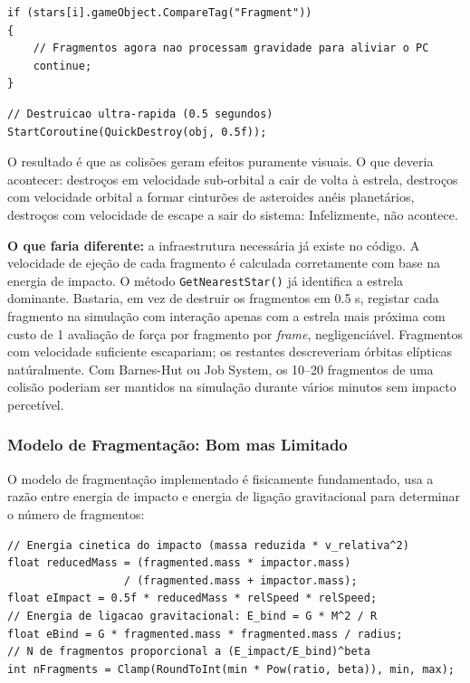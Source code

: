 \documentclass[12pt,a4paper]{article}
\begin{document}
\begin{lstlisting}[caption={StarSystemManager.cs - fragmentos exclu\'{i}dos do loop gravitacional}]
if (stars[i].gameObject.CompareTag("Fragment"))
{
    // Fragmentos agora nao processam gravidade para aliviar o PC
    continue;
}
\end{lstlisting}

\begin{lstlisting}[caption={PlanetCollision.cs --- destrui\c{c}\~{a}o em 0.5 s sem f\'{i}sica}]
// Destruicao ultra-rapida (0.5 segundos)
StartCoroutine(QuickDestroy(obj, 0.5f));
\end{lstlisting}

O resultado \'{e} que as colis\~{o}es geram efeitos puramente visuais. O que deveria acontecer: destro\c{c}os em velocidade sub-orbital a cair de volta \`{a} estrela, destro\c{c}os com velocidade orbital a formar cintur\~{o}es de asteroides an\'{e}is planet\'{a}rios, destro\c{c}os com velocidade de escape a sair do sistema: Infelizmente, n\~{a}o acontece.

\textbf{O que faria diferente:} a infraestrutura necess\'{a}ria j\'{a} existe no c\'{o}digo. A velocidade de eje\c{c}\~{a}o de cada fragmento \'{e} calculada corretamente com base na energia de impacto. O m\'{e}todo \texttt{GetNearestStar()} j\'{a} identifica a estrela dominante. Bastaria, em vez de destruir os fragmentos em 0.5 s, registar cada fragmento na simula\c{c}\~{a}o com intera\c{c}\~{a}o apenas com a estrela mais pr\'{o}xima com custo de 1 avalia\c{c}\~{a}o de for\c{c}a por fragmento por \textit{frame}, negligenci\'{a}vel. Fragmentos com velocidade suficiente escapariam; os restantes descre\-veriam \'{o}rbitas el\'{i}pticas nat\'{u}ralmente. Com Barnes-Hut ou Job System, os 10--20 fragmentos de uma colis\~{a}o poderiam ser mantidos na simula\c{c}\~{a}o durante v\'{a}rios minutos sem impacto percet\'{i}vel.

\subsubsection{Modelo de Fragmenta\c{c}\~{a}o: Bom mas Limitado}

O modelo de fragmenta\c{c}\~{a}o implementado \'{e} fisicamente fundamentado, usa a raz\~{a}o entre energia de impacto e energia de liga\c{c}\~{a}o gravitacional para determinar o n\'{u}mero de fragmentos:

\begin{lstlisting}[caption={PlanetCollision.cs - modelo de fragmenta\c{c}\~{a}o baseado em energia}]
// Energia cinetica do impacto (massa reduzida * v_relativa^2)
float reducedMass = (fragmented.mass * impactor.mass)
                  / (fragmented.mass + impactor.mass);
float eImpact = 0.5f * reducedMass * relSpeed * relSpeed;
// Energia de ligacao gravitacional: E_bind = G * M^2 / R
float eBind = G * fragmented.mass * fragmented.mass / radius;
// N de fragmentos proporcional a (E_impact/E_bind)^beta
int nFragments = Clamp(RoundToInt(min * Pow(ratio, beta)), min, max);
\end{lstlisting}
\end{document}
